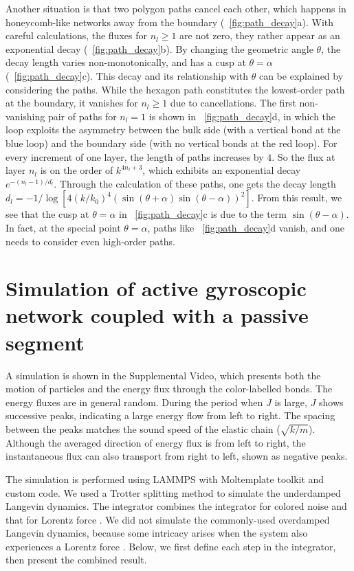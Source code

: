 \documentclass[
 amsmath,amssymb,
 aps,
 pre,
 longbibliography,
 10pt, onecolumn,
 notitlepage
]{revtex4-1}
\begin{document}
Another situation is that two polygon paths cancel each other, which happens in honeycomb-like networks away from the boundary (\figurename~\ref{fig:path_decay}a).
With careful calculations, the fluxes for $n_l\ge 1$ are not zero, they rather appear as an exponential decay (\figurename~\ref{fig:path_decay}b). By changing the geometric angle $\theta$, the decay length varies non-monotonically, and has a cusp at $\theta=\alpha$ (\figurename~\ref{fig:path_decay}c).
This decay and its relationship with $\theta$ can be explained by considering the paths.
While the hexagon path constitutes the lowest-order path at the boundary, it vanishes for $n_l\ge 1$ due to cancellations. The first non-vanishing pair of paths for $n_l=1$ is shown in \figurename~\ref{fig:path_decay}d, in which the loop exploits the asymmetry between the bulk side (with a vertical bond at the blue loop) and the boundary side (with no vertical bonds at the red loop). For every increment of one layer, the length of paths increases by $4$. So the flux at layer $n_l$ is on the order of $k^{4n_l+3}$, which exhibits an exponential decay $e^{-(n_l-1)/d_l}$.
Through the calculation of these paths, one gets the decay length $d_l = -1/\log[4(k/k_0)^4(\sin(\theta+\alpha)\sin(\theta-\alpha))^2]$. From this result, we see that the cusp at $\theta=\alpha$ in \figurename~\ref{fig:path_decay}c is due to the term $\sin(\theta-\alpha)$. In fact, at the special point $\theta=\alpha$, paths like \figurename~\ref{fig:path_decay}d vanish, and one needs to consider even high-order paths.


\section{Simulation of active gyroscopic network coupled with a passive segment}
A simulation is shown in the Supplemental Video, which presents both the motion of particles and the energy flux through the color-labelled bonds.
The energy fluxes are in general random. During the period when $J$ is large, $J$ shows successive peaks, indicating a large energy flow from left to right. The spacing between the peaks matches the sound speed of the elastic chain ($\sqrt{k/m}$). Although the averaged direction of energy flux is from left to right, the instantaneous flux can also transport from right to left, shown as negative peaks. 

The simulation is performed using LAMMPS \cite{Plimpton1995FastParallel} with Moltemplate toolkit \cite{Jewett2013MoltemplateCoarseGrained} and custom code.
We used a Trotter splitting method \cite{Tuckerman1992ReversibleMultiple,Bussi2007AccurateSampling} to simulate the underdamped Langevin dynamics.
The integrator combines the integrator for colored noise \cite{Ceriotti2010ColoredNoiseThermostats} and that for Lorentz force \cite{Chin2008SymplecticEnergyconserving}.
We did not simulate the commonly-used overdamped Langevin dynamics, because some intricacy arises when the system also experiences a Lorentz force \cite{Chun2018EmergenceNonwhite}.
Below, we first define each step in the integrator, then present the combined result.
\end{document}
